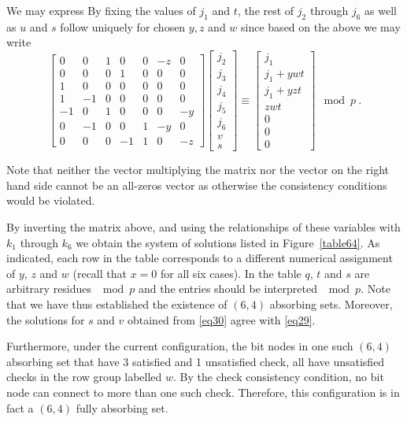{We may express By fixing the values of $j_1$ and $t$, the rest of
$j_2$ through $j_6$ as well as $u$ and $s$ follow uniquely for
chosen $y,z$ and $w$ since based on the above we may write
\begin{equation}\label{eq30}
\left[ \begin{array}{ccccccc} 0 & 0 & 1 & 0 & 0 & -z &0\\
0 & 0 & 0 & 1 & 0 & 0 &0\\
1 & 0 & 0 & 0 & 0 & 0 &0\\
1 & -1 & 0 & 0 & 0 & 0 &0\\
-1 & 0 & 1 & 0 & 0 & 0 &-y\\
0 & -1 & 0 & 0 & 1 & -y &0\\
0 & 0 & 0 & -1 & 1 & 0 & -z
\end{array}\right] \left[\begin{array}{c}
j_2\\j_3\\j_4\\j_5\\j_6\\v\\s\end{array}\right] \equiv
\left[\begin{array}{c}j_1\\j_1+ywt\\j_1+yzt\\zwt\\0\\0\\0\end{array}\right]
\mod p~.
\end{equation}

Note that neither the vector multiplying the matrix nor the vector
on the right hand side cannot be an all-zeros vector as otherwise
the consistency conditions would be violated.

By inverting the matrix above, and using the relationships of these
variables with $k_1$ through $k_6$ we obtain the system of solutions
listed in Figure~\ref{table64}. As indicated, each row in the table
corresponds to a different numerical assignment of $y$, $z$ and $w$
(recall that $x=0$ for all six cases). In the table $q$, $t$ and $s$
are arbitrary residues $\mod p$ and the entries should be
interpreted $\mod p$. Note that we have thus established the
existence of $(6,4)$ absorbing sets. Moreover, the solutions for $s$
and $v$ obtained from \eqref{eq30} agree with \eqref{eq29}.

Furthermore, under the current configuration, the bit nodes in one
such $(6,4)$ absorbing set that have 3 satisfied and 1 unsatisfied
check, all have unsatisfied checks in the row group labelled $w$. By
the check consistency condition, no bit node can connect to more
than one such check. Therefore, this configuration is in fact a
$(6,4)$ fully absorbing set.

}

